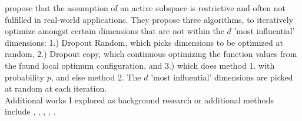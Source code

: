 \citep{Li2018} propose that the assumption of an active subspace is restrictive and often not fulfilled in real-world applications.
They propose three algorithms, to iteratively optimize amongst certain dimensions that are not within the $d$ 'most influential' dimensions: 1.) Dropout Random, which picks dimensions to be optimized at random, 2.) Dropout copy, which continuous optimizing the function values from the found local optimum configuration, and 3.) which does method 1. with probability $p$, and else method 2.
The $d$ 'most influential' dimensions are picked at random at each iteration. \\

Additional works I explored as background research or additional methods include \citep{KernelGibbsSampler}, \citep{VirtualVsReal}, \citep{SensorPlacement}, \citep{BatchedBO}, \citep{GPforML}.
